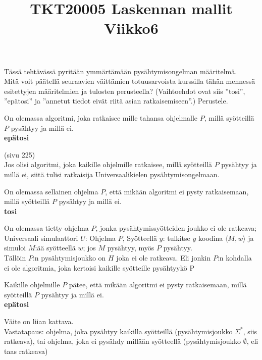 \documentclass[12pt,a4paper]{article}
\title{TKT20005 Laskennan mallit Viikko6}
\date{}
\begin{document}
\maketitle

 Tässä tehtävässä pyritään ymmärtämään pysähtymisongelman määritelmä.\\

Mitä voit päätellä seuraavien väittämien totuusarvoista
kurssilla tähän mennessä esitettyjen määritelmien ja
tulosten perusteella?
(Vaihtoehdot ovat siis ''tosi'', ''epätosi'' ja
''annetut tiedot eivät riitä asian ratkaisemiseen''.)
Perustele.
\begin{alakohta}
\item
On olemassa algoritmi, joka ratkaisee mille tahansa
ohjelmalle $P$, millä syötteillä $P$ pysähtyy
ja millä ei.\\

{\bf epätosi}

(sivu 225)\\
Jos olisi algoritmi, joka kaikille ohjelmille ratkaisee, millä 
syötteillä $P$ pysähtyy ja millä ei, siitä tulisi
ratkaisija Universaalikielen pysähtymisongelmaan.\\

\item
On olemassa sellainen ohjelma $P$, että mikään algoritmi
ei pysty ratkaisemaan, millä syötteillä $P$ pysähtyy
ja millä ei.\\

{\bf tosi}

On olemassa tietty ohjelma $P$,
jonka pysähtymissyötteiden joukko ei ole ratkeava;
Universaali simulaattori $U$:
Ohjelma $P$, Syötteellä $y$: tulkitse $y$ koodina
$\langle M,w\rangle$ ja simuloi $M$:ää syötteellä $w$; 
jos $M$ pysähtyy, myös $P$ pysähtyy.\\

Tällöin $P$:n pysähtymisjoukko on $H$
joka ei ole ratkeava. Eli jonkin $P$:n kohdalla ei
ole algoritmia, joka kertoisi kaikille syötteille
pysähtyykö P\\


\item
Kaikille ohjelmille $P$ pätee, että mikään algoritmi
ei pysty ratkaisemaan, millä syötteillä $P$ pysähtyy
ja millä ei.\\

{\bf epätosi}

Väite on liian kattava.\\
Vastatapaus: ohjelma, joka pysähtyy kaikilla syötteillä
(pysähtymisjoukko $\Sigma^*$, siis ratkeava), tai ohjelma, 
joka ei pysähdy millään syötteellä
(pysähtymisjoukko $\emptyset$, eli taas ratkeava)

\end{alakohta}
\end{document}
